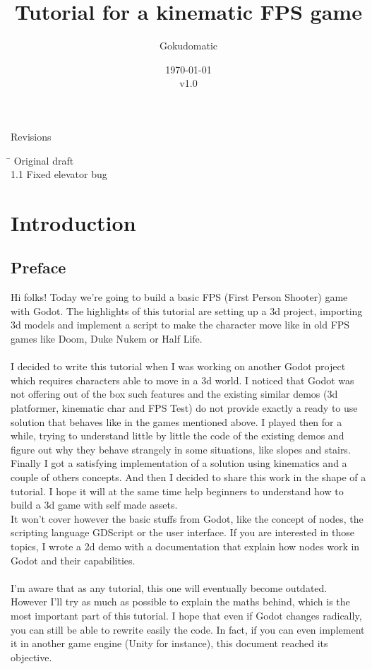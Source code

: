 \documentclass[10pt,a4paper]{article}
\author{Gokudomatic}
\title{Tutorial for a kinematic FPS game}
\date{\today\\v1.0}
\begin{document}
\maketitle

\clearpage

\begin{center}
{\Large Revisions}
\begin{tabbing}
\hspace{1cm} \=  \> Original draft\\
1.1 \> Fixed elevator bug
\end{tabbing}
\end{center}

\clearpage

\tableofcontents

\clearpage

\section{Introduction}

\subsection{Preface}
Hi folks! 
Today we're going to build a basic FPS (First Person Shooter) game with Godot. The highlights of this tutorial are setting up a 3d project, importing 3d models and implement a script to make the character move like in old FPS games like Doom\cite{doom}, Duke Nukem or Half Life.\\
\\
I decided to write this tutorial when I was working on another Godot project which requires characters able to move in a 3d world. I noticed that Godot was not offering out of the box such features and the existing similar demos (3d platformer, kinematic char and FPS Test) do not provide exactly a ready to use solution that behaves like in the games mentioned above. I played then for a while, trying to understand little by little the code of the existing demos and figure out why they behave strangely in some situations, like slopes and stairs. Finally I got a satisfying implementation of a solution using kinematics and a couple of others concepts. And then I decided to share this work in the shape of a tutorial. I hope it will at the same time help beginners to understand how to build a 3d game with self made assets.\\
It won't cover however the basic stuffs from Godot, like the concept of nodes, the scripting language GDScript or the user interface. If you are interested in those topics, I wrote a 2d demo\cite{fox2d} with a documentation that explain how nodes work in Godot and their capabilities.\\
\\
I'm aware that as any tutorial, this one will eventually become outdated. However I'll try as much as possible to explain the maths behind, which is the most important part of this tutorial. I hope that even if Godot changes radically, you can still be able to rewrite easily the code. In fact, if you can even implement it in another game engine (Unity for instance), this document reached its objective.
\end{document}
